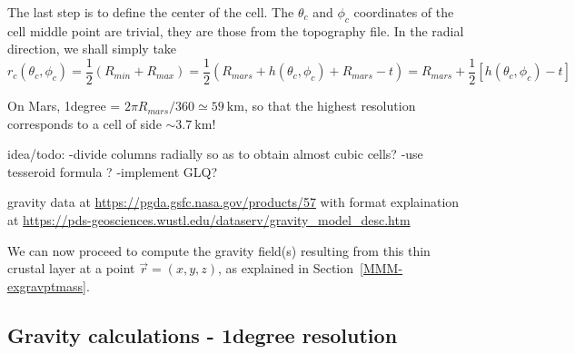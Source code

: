 The last step is to define the center of the cell. The $\theta_c$ and $\phi_c$ 
coordinates of the cell middle point are trivial, they are those from the 
topography file. In the radial direction, we shall simply take
\[
r_c(\theta_c,\phi_c)=\frac12( R_{min}+R_{max})=\frac12 (R_{mars}+h(\theta_c,\phi_c)+R_{mars}-t)= R_{mars} + \frac12[h(\theta_c,\phi_c)-t]
\]

On Mars, 1degree = $2\pi R_{mars}/360 \simeq 59~\si{\km}$, so that the highest resolution
corresponds to a cell of side $\sim 3.7~\si{\km}$!

idea/todo: 
-divide columns radially so as to obtain almost cubic cells?
-use tesseroid formula ?
-implement GLQ?

gravity data at \url{https://pgda.gsfc.nasa.gov/products/57}
with format explaination at \url{https://pds-geosciences.wustl.edu/dataserv/gravity_model_desc.htm}

We can now proceed to compute the gravity field(s) 
resulting from this thin crustal layer at a point $\vec{r}=(x,y,z)$, as 
explained in Section~\ref{MMM-exgravptmass}.

\subsection*{Gravity calculations - 1degree resolution}

